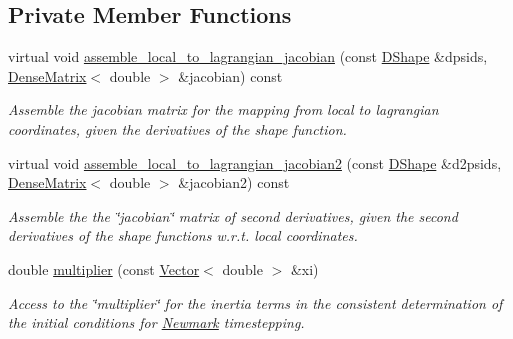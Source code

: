 \subsection*{Private Member Functions}
\begin{DoxyCompactItemize}
\item 
virtual void \hyperlink{classoomph_1_1SolidFiniteElement_a91f14d25d145e7ef47d55cabfd332f5c}{assemble\+\_\+local\+\_\+to\+\_\+lagrangian\+\_\+jacobian} (const \hyperlink{classoomph_1_1DShape}{D\+Shape} \&dpsids, \hyperlink{classoomph_1_1DenseMatrix}{Dense\+Matrix}$<$ double $>$ \&jacobian) const
\begin{DoxyCompactList}\small\item\em Assemble the jacobian matrix for the mapping from local to lagrangian coordinates, given the derivatives of the shape function. \end{DoxyCompactList}\item 
virtual void \hyperlink{classoomph_1_1SolidFiniteElement_a33ab1427cebdc36ff77d897f5db9f3a6}{assemble\+\_\+local\+\_\+to\+\_\+lagrangian\+\_\+jacobian2} (const \hyperlink{classoomph_1_1DShape}{D\+Shape} \&d2psids, \hyperlink{classoomph_1_1DenseMatrix}{Dense\+Matrix}$<$ double $>$ \&jacobian2) const
\begin{DoxyCompactList}\small\item\em Assemble the the \char`\"{}jacobian\char`\"{} matrix of second derivatives, given the second derivatives of the shape functions w.\+r.\+t. local coordinates. \end{DoxyCompactList}\item 
double \hyperlink{classoomph_1_1SolidFiniteElement_ab07798fe92a5bf61903b41209f67fbbf}{multiplier} (const \hyperlink{classoomph_1_1Vector}{Vector}$<$ double $>$ \&xi)
\begin{DoxyCompactList}\small\item\em Access to the \char`\"{}multiplier\char`\"{} for the inertia terms in the consistent determination of the initial conditions for \hyperlink{classoomph_1_1Newmark}{Newmark} timestepping. \end{DoxyCompactList}\end{DoxyCompactItemize}
